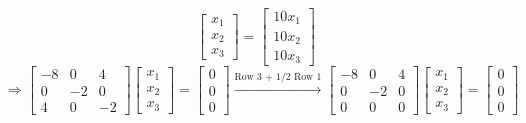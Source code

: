 \begin{enumerate}[font=\bfseries]
\begin{enumerate}
\[                \begin{bmatrix}
                    x_1 \\
                    x_2 \\
                    x_3
                \end{bmatrix}
                =
                \begin{bmatrix}
                    10x_1 \\
                    10x_2 \\
                    10x_3
                \end{bmatrix}
            \]
            \[
                \Rightarrow
                \begin{bmatrix}
                    -8 & 0 & 4 \\
                    0 & -2 & 0 \\
                    4 & 0 & -2
                \end{bmatrix}
                \begin{bmatrix}
                    x_1 \\
                    x_2 \\
                    x_3
                \end{bmatrix}
                =
                \begin{bmatrix}
                    0 \\
                    0 \\
                    0
                \end{bmatrix}
                \overset{\text{Row 3 + 1/2 Row 1}}{\longrightarrow}
                \begin{bmatrix}
                    -8 & 0 & 4 \\
                    0 & -2 & 0 \\
                    0 & 0 & 0
                \end{bmatrix}
                \begin{bmatrix}
                    x_1 \\
                    x_2 \\
                    x_3
                \end{bmatrix}
                =
                \begin{bmatrix}
                    0 \\
                    0 \\
                    0
                \end{bmatrix}
\]
\end{enumerate}
\end{enumerate}
